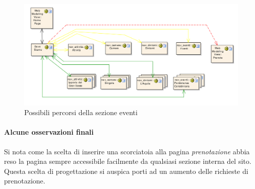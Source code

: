 \documentclass[a4paper,12pt,hidelinks]{report}
\begin{document}
\begin{figure}[h!]%
    \includegraphics[width=1.1\textwidth,keepaspectratio=true]{../img/nav_dovesiamo}
    \centering
    \caption{Possibili percorsi della sezione eventi}%
    \label{fig:nav_dovesiamo}%
\end{figure}

\paragraph{Alcune osservazioni finali}
Si nota come la scelta di inserire una scorciatoia alla pagina \textit{prenotazione} abbia reso la pagina sempre accessibile facilmente da qualsiasi sezione 
interna del sito. Questa scelta di progettazione si auspica porti ad un aumento delle richieste di prenotazione.
\end{document}
